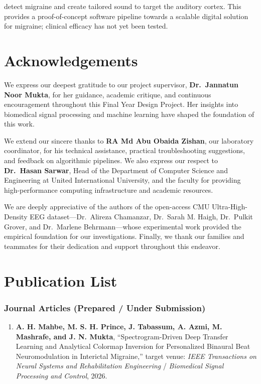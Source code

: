 \documentclass[12pt, a4paper]{report}
\begin{document}
detect migraine and create tailored sound to target the auditory cortex. This provides a proof-of-concept software pipeline towards a scalable digital solution for migraine; clinical efficacy has not yet been tested.
\newpage

\chapter*{Acknowledgements}
We express our deepest gratitude to our project supervisor, \textbf{Dr.~Jannatun Noor Mukta}, for her guidance, academic critique, and continuous encouragement throughout this Final Year Design Project. Her insights into biomedical signal processing and machine learning have shaped the foundation of this work.

We extend our sincere thanks to \textbf{RA Md Abu Obaida Zishan}, our laboratory coordinator, for his technical assistance, practical troubleshooting suggestions, and feedback on algorithmic pipelines. We also express our respect to \textbf{Dr.~Hasan Sarwar}, Head of the Department of Computer Science and Engineering at United International University, and the faculty for providing high-performance computing infrastructure and academic resources.

We are deeply appreciative of the authors of the open-access CMU Ultra-High-Density EEG dataset---Dr.~Alireza Chamanzar, Dr.~Sarah M. Haigh, Dr.~Pulkit Grover, and Dr.~Marlene Behrmann---whose experimental work provided the empirical foundation for our investigations. Finally, we thank our families and teammates for their dedication and support throughout this endeavor.

\newpage

\chapter*{Publication List}

\subsection*{Journal Articles (Prepared / Under Submission)}
\begin{enumerate}
    \item \textbf{A. H. Mahbe, M. S. H. Prince, J. Tabassum, A. Azmi, M. Mashrafe, and J. N. Mukta}, ``Spectrogram-Driven Deep Transfer Learning and Analytical Colormap Inversion for Personalized Binaural Beat Neuromodulation in Interictal Migraine,'' target venue: \textit{IEEE Transactions on Neural Systems and Rehabilitation Engineering} / \textit{Biomedical Signal Processing and Control}, 2026.
\end{enumerate}
\end{document}
